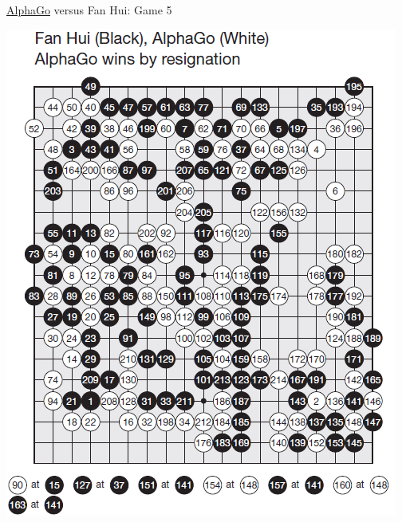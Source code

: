 \documentclass{beamer}
\begin{document}
{    \begin{frame}{{\color{white}\underline{AlphaGo}} versus {\color{black}Fan Hui}: Game 5}
      \begin{center}
        \includegraphics[height=.9\textheight]{../img/AlphaGo_vs_Fan_Hui_Game_5.png}
      \end{center}
    \end{frame}
  }
\end{document}
